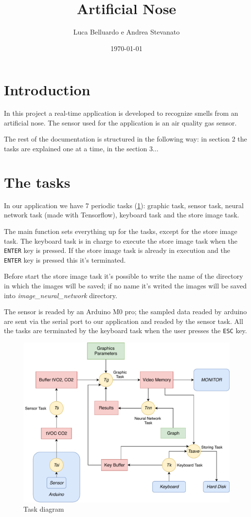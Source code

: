 \documentclass[12pt]{article}
\title{Artificial Nose}
\author{Luca Belluardo e Andrea Stevanato}
\date{\today}
\begin{document}
\maketitle

\section{Introduction}
In this project a real-time application is developed to recognize smells from an
artificial nose. The sensor used for the application is an air quality gas sensor.

The rest of the documentation is structured in the following way: in section
2 the tasks are explained one at a time, in the section 3...

\section{The tasks}
In our application we have 7 periodic tasks (\ref{tdiagram}): graphic task, sensor task,
neural network task (made with Tensorflow), keyboard task and the store image
task.

The main function sets everything up for the tasks, except for the store
image task. The keyboard task is in charge to execute the store image task
when the \texttt{ENTER} key is pressed. If the store image task is already in
execution and the \texttt{ENTER} key is pressed this it's terminated.

Before start the store image task it's possible to write the name of the
directory in which the images will be saved; if no name it's writed the
images will be saved into \textit{image\_neural\_network} directory.

The sensor is readed by an Arduino M0 pro; the sampled data readed by arduino
are sent via the serial port to our application and readed by the sensor
task. All the tasks are terminated by the keyboard task when the user presses
the \texttt{ESC} key.

\begin{figure}[!t]
    \includegraphics[width=\textwidth]{diagram.pdf}
    \caption{Task diagram}
    \label{tdiagram}
\end{figure}
\end{document}
